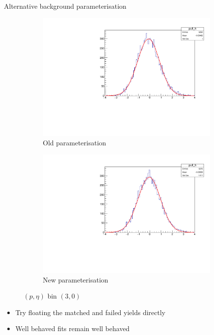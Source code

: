 \documentclass[xcolor={dvipsnames}]{beamer}
\begin{document}
\begin{frame}{Alternative background parameterisation}
  \vspace{0.0cm}
  \begin{figure}[htb]
    \centering
    \begin{subfigure}{0.45\textwidth}
      \centering
      \includegraphics[width=1.0\textwidth]{Plots/signal_efficiency_pull_MuonUT_P3_ETA0.pdf}
      \caption*{Old parameterisation}
    \end{subfigure}%
    \begin{subfigure}{0.45\textwidth}
      \centering
      \includegraphics[width=1.0\textwidth]{Plots/signal_efficiency_pull_MuonUT_P3_ETA0_NoBkgEff.pdf}
      \caption*{New parameterisation}
    \end{subfigure}
    \vspace{-0.2cm}
    \caption*{$(p, \eta)$ bin $(3, 0)$}
  \end{figure}
  \begin{itemize}
    \item{Try floating the matched and failed yields directly}
    \item{Well behaved fits remain well behaved}
  \end{itemize}
\end{frame}
\end{document}
